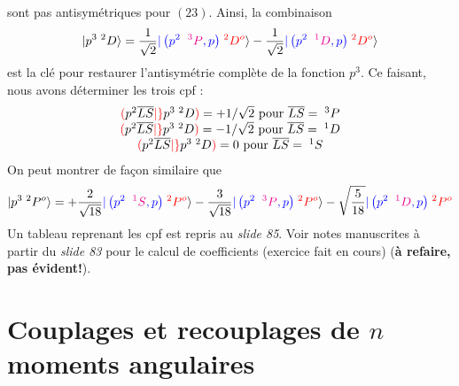sont pas antisymétriques pour $(23)$. Ainsi, la combinaison
\begin{equation}
\vert p^3 \; ^2D \rangle =
\frac{1}{\sqrt{2}}  {\color{blue}
\vert \left( p^{2} \; \; {\color{magenta} ^3P}, p \right)  }
\;  {\color{red} ^2D^o}
 \rangle 
- \frac{1}{\sqrt{2}}
 {\color{blue}
\vert \left( p^{2} \; \; {\color{magenta} ^1D}, p \right)  }
\;  {\color{red} ^2D^o}
 \rangle
\end{equation}
est la clé pour restaurer l'antisymétrie complète de la fonction $p^3$. Ce faisant, nous
avons déterminer les trois cpf :
\begin{equation}
\begin{array}{c}
  {\color{red}( } p^{2}  \overline{L} \overline{S} 
{\color{red} \vert \} }
 p^3 \; ^2D {\color{red} )} = +1/\sqrt{2} ~\mbox{pour}~
\overline{L} \overline{S}  = \; ^3P\\
  {\color{red}( } p^{2}  \overline{L} \overline{S} 
{\color{red} \vert \} }
 p^3 \; ^2D {\color{red} )} = -1/\sqrt{2} ~\mbox{pour}~
\overline{L} \overline{S}  = \; ^1D\\
  {\color{red}( } p^{2}  \overline{L} \overline{S} 
{\color{red} \vert \} }
 p^3 \; ^2D {\color{red} )} = 0 ~\mbox{pour}~
\overline{L} \overline{S}  = \; ^1S
\end{array}
\end{equation}
On peut montrer de façon similaire que
\begin{equation}
\vert p^3 \; ^2P^o \rangle =
+ \frac{2}{\sqrt{18}}   {\color{blue}
\vert \left( p^{2} \; \; {\color{magenta} ^1S}, p \right)  }
\;  {\color{red} ^2P^o}
 \rangle 
- \frac{3}{\sqrt{18}}
 {\color{blue}
\vert \left( p^{2} \; \; {\color{magenta} ^3P}, p \right)  }
\;  {\color{red} ^2P^o}
 \rangle 
- \sqrt{\frac{5}{18}} 
 {\color{blue}
\vert \left( p^{2} \; \;
{\color{magenta} ^1D }, p \right)  }
\;  {\color{red} ^2P^o}
\end{equation}
Un tableau reprenant les cpf est repris au \textit{slide 85}. Voir notes manuscrites à partir
du \textit{slide 83} pour le calcul de coefficients (exercice fait en cours) (\textbf{à refaire, pas évident!}).



\section{Couplages et recouplages de $n$ moments angulaires}
